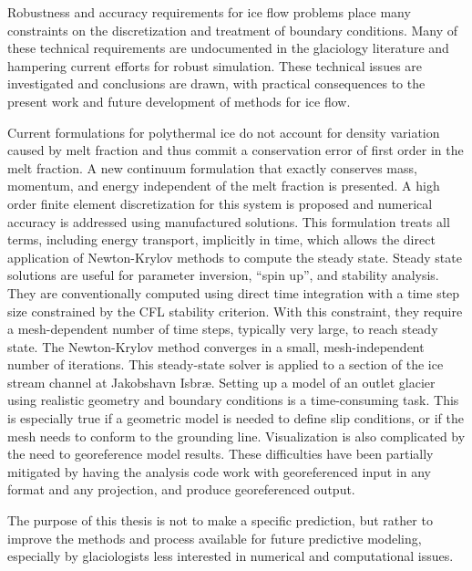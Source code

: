 Robustness and accuracy requirements for ice flow problems place many constraints on the discretization and treatment of boundary conditions.
Many of these technical requirements are undocumented in the glaciology literature and hampering current efforts for robust simulation.
These technical issues are investigated and conclusions are drawn, with practical consequences to the present work and future development of methods for ice flow.

Current formulations for polythermal ice do not account for density variation caused by melt fraction and thus commit a conservation error of first order in the melt fraction.
A new continuum formulation that exactly conserves mass, momentum, and energy independent of the melt fraction is presented.
A high order finite element discretization for this system is proposed and numerical accuracy is addressed using manufactured solutions.
This formulation treats all terms, including energy transport, implicitly in time, which allows the direct application of Newton-Krylov methods to compute the steady state.
Steady state solutions are useful for parameter inversion, ``spin up'', and stability analysis.
They are conventionally computed using direct time integration with a time step size constrained by the CFL stability criterion.
With this constraint, they require a mesh-dependent number of time steps, typically very large, to reach steady state.
The Newton-Krylov method converges in a small, mesh-independent number of iterations.
This steady-state solver is applied to a section of the ice stream channel at Jakobshavn Isbr{\ae}.
Setting up a model of an outlet glacier using realistic geometry and boundary conditions is a time-consuming task.
This is especially true if a geometric model is needed to define slip conditions, or if the mesh needs to conform to the grounding line.
Visualization is also complicated by the need to georeference model results.
These difficulties have been partially mitigated by having the analysis code work with georeferenced input in any format and any projection, and produce georeferenced output.

The purpose of this thesis is not to make a specific prediction, but rather to improve the methods and process available for future predictive modeling, especially by glaciologists less interested in numerical and computational issues.
